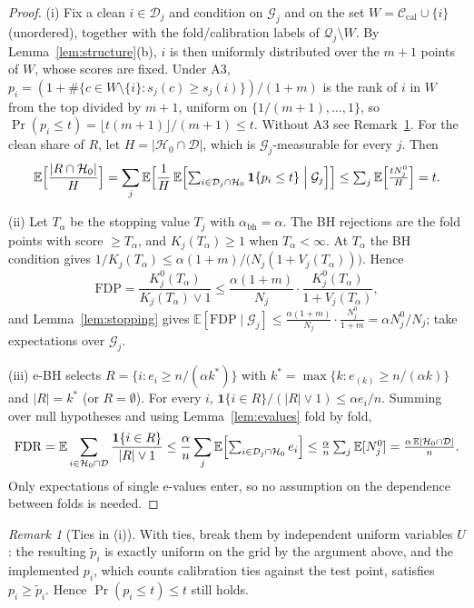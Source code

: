 \documentclass[11pt]{article}
\theoremstyle{definition}
\theoremstyle{remark}
\newtheorem{remark}{Remark}
\newcommand{\Cal}{\mathcal{C}_{\mathrm{cal}}}
\newcommand{\D}{\mathcal{D}}
\newcommand{\G}{\mathcal{G}}
\newcommand{\Q}{\mathcal{Q}}
\newcommand{\Hnull}{\mathcal{H}_0}
\newcommand{\E}{\mathbb{E}}
\newcommand{\1}{\mathbf{1}}
\begin{document}
\begin{proof}
(i) Fix a clean $i\in\D_j$ and condition on $\G_j$ and on the set $W=\Cal\cup\{i\}$ (unordered),
together with the fold/calibration labels of $\Q_j\setminus W$. By Lemma~\ref{lem:structure}(b),
$i$ is then uniformly distributed over the $m+1$ points of $W$, whose scores are fixed. Under A3,
$p_i=(1+\#\{c\in W\setminus\{i\}:s_j(c)\ge s_j(i)\})/(1+m)$ is the rank of $i$ in $W$ from the top
divided by $m+1$, uniform on $\{1/(m+1),\dots,1\}$, so $\Pr(p_i\le t)=\lfloor t(m+1)\rfloor/(m+1)\le t$.
Without A3 see Remark~\ref{rem:ties-p}. For the clean share of $R$, let $H=|\Hnull\cap\D|$,
which is $\G_j$-measurable for every $j$. Then
\[
\E\Bigl[\frac{|R\cap\Hnull|}{H}\Bigr]=\sum_j\E\Bigl[\frac{1}{H}\,\E\Bigl[\textstyle\sum_{i\in\D_j\cap\Hnull}\1\{p_i\le t\}\Bigm|\G_j\Bigr]\Bigr]
\le\sum_j\E\Bigl[\frac{tN_j^0}{H}\Bigr]=t .
\]

(ii) Let $T_\alpha$ be the stopping value $T_j$ with $\alpha_{\mathrm{bh}}=\alpha$. The BH rejections
are the fold points with score $\ge T_\alpha$, and $K_j(T_\alpha)\ge1$ when $T_\alpha<\infty$. At
$T_\alpha$ the BH condition gives
$1/K_j(T_\alpha)\le\alpha(1+m)/\bigl(N_j(1+V_j(T_\alpha))\bigr)$. Hence
\[
\mathrm{FDP}=\frac{K^0_j(T_\alpha)}{K_j(T_\alpha)\vee1}\le\frac{\alpha(1+m)}{N_j}\cdot\frac{K^0_j(T_\alpha)}{1+V_j(T_\alpha)},
\]
and Lemma~\ref{lem:stopping} gives
$\E[\mathrm{FDP}\mid\G_j]\le\frac{\alpha(1+m)}{N_j}\cdot\frac{N_j^0}{1+m}=\alpha N_j^0/N_j$; take
expectations over $\G_j$.

(iii) e-BH selects $R=\{i:e_i\ge n/(\alpha k^\ast)\}$ with
$k^\ast=\max\{k:e_{(k)}\ge n/(\alpha k)\}$ and $|R|=k^\ast$ (or $R=\emptyset$). For every $i$,
$\1\{i\in R\}/(|R|\vee1)\le\alpha e_i/n$. Summing over null hypotheses and using
Lemma~\ref{lem:evalues} fold by fold,
\[
\mathrm{FDR}=\E\sum_{i\in\Hnull\cap\D}\frac{\1\{i\in R\}}{|R|\vee1}
\le\frac{\alpha}{n}\sum_{j}\E\Bigl[\textstyle\sum_{i\in\D_j\cap\Hnull}e_i\Bigr]\le\frac{\alpha}{n}\sum_j \E[N_j^0]
=\frac{\alpha\,\E|\Hnull\cap\D|}{n}.
\]
Only expectations of single e-values enter, so no assumption on the dependence between folds is
needed.
\end{proof}

\begin{remark}[Ties in (i)]\label{rem:ties-p}
With ties, break them by independent uniform variables $U$: the resulting $\tilde p_i$ is exactly
uniform on the grid by the argument above, and the implemented $p_i$, which counts calibration
ties against the test point, satisfies $p_i\ge\tilde p_i$. Hence $\Pr(p_i\le t)\le t$ still holds.
\end{remark}
\end{document}
